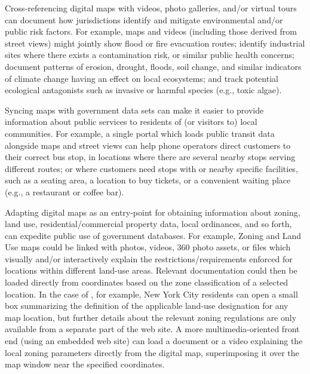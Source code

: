 \documentclass[10.5pt]{article}
\begin{document}
{\begin{description}[leftmargin=3pt, itemsep=1pt]
\item[Emergency Management and Hazard Mitigation]  Cross-referencing digital maps with videos, 
photo galleries, and/or virtual tours can document how jurisdictions identify and 
mitigate environmental and/or public risk factors.  For example, maps and videos 
(including those derived from street views) might jointly show flood or fire evacuation 
routes; identify industrial sites where there exists a contamination risk, or similar 
public health concerns; document patterns of erosion, drought, floods, soil change, and 
similar indicators of climate change having an effect on local ecosystems; and track 
potential ecological antagonists such as invasive or harmful species (e.g., 
toxic algae).

\item[Government Services]  Syncing maps with government data sets can make it easier to 
provide information about public services to residents of (or visitors to) local 
communities.  For example, a single portal which loads public transit data alongside 
maps and street views can help phone operators direct customers to their correct 
bus stop, in locations where there are several nearby stops serving different 
routes; or where customers need stops with or nearby specific facilities, 
such as a seating area, a location to buy tickets, or a convenient waiting place 
(e.g., a restaurant or coffee bar).

\item[Zoning and Land Use]  Adapting digital maps as an entry-point for 
obtaining information about zoning, land use, residential/commercial 
property data, local ordinances, and so forth, can expedite public use of government databases.  
For example, Zoning and Land Use maps could be linked with photos, videos, 360\textdegree{} photo assets, 
or \PDF{} files which visually and/or interactively explain the restrictions/requirements 
enforced for locations within different land-use areas.  
Relevant documentation could then be loaded directly from \GIS{} coordinates based on the 
zone classification of a selected \GIS{} location.  In the case of \ZoLa{}, for example, 
New York City residents can open a small box summarizing the definition of the 
applicable land-use designation for any map location, but further details about 
the relevant zoning regulations are only available from a separate part of the 
web site.  A more multimedia-oriented front end (using an embedded web site) can 
load a \PDF{} document or a video explaining the local zoning parameters 
directly from the digital map, superimposing it over the map window near the specified 
\GIS{} coordinates.          


\end{description}}
\end{document}
